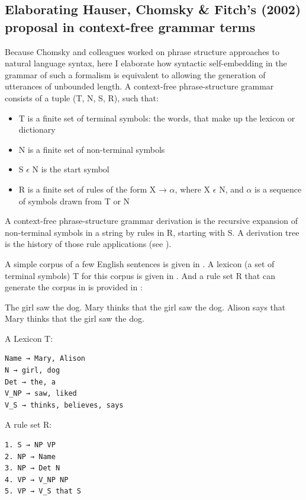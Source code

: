 \documentclass{article}
\begin{document}
\subsection{Elaborating Hauser, Chomsky \& Fitch's (2002) proposal in context-free grammar terms}

Because Chomsky and colleagues worked on phrase structure approaches to natural language syntax, here I elaborate how syntactic self-embedding in the grammar of such a formalism is equivalent to allowing the generation of utterances of unbounded length. A context-free phrase-structure grammar consists of a tuple (T, N, S, R), such that:

\begin{itemize}
    \item T is a finite set of terminal symbols: the words, that make up the lexicon or dictionary
    \item N is a finite set of non-terminal symbols
    \item S $\epsilon$ N is the start symbol
    \item R is a finite set of rules of the form X → $\alpha$, where X $\epsilon$ N, and $\alpha$ is a sequence of symbols drawn from T or N
\end{itemize}

A context-free phrase-structure grammar derivation is the recursive expansion of non-terminal symbols in a string by rules in R, starting with S. A derivation tree is the history of those rule applications (see \cite{chomsky1959certain, lewis1998elements, hopcroft2001introduction}).

A simple corpus of a few English sentences is given in . A lexicon (a set of terminal symbols) T for this corpus is given in . And a rule set R that can generate the corpus in  is provided in :

\eal
\label{corpus1}
\ex\label{corpus1a} The girl saw the dog.
\ex\label{corpus1c} Mary thinks that the girl saw the dog.
\ex\label{corpus1d} Alison says that Mary thinks that the girl saw the dog.
\zl

\ea
\label{lexicon1}
A Lexicon T:
\begin{verbatim}
Name → Mary, Alison
N → girl, dog
Det → the, a
V_NP → saw, liked
V_S → thinks, believes, says
\end{verbatim}
\z

\ea
\label{cfg1}
A rule set R:
\begin{verbatim}
1. S → NP VP
2. NP → Name
3. NP → Det N
4. VP → V_NP NP
5. VP → V_S that S
\end{verbatim}
\z
\end{document}
